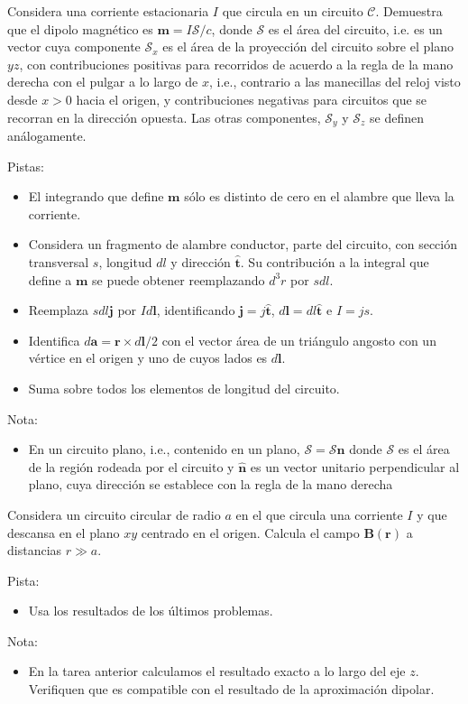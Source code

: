 \documentclass{exam}
\begin{document}
\begin{questions}
\question Considera una corriente estacionaria $I$ que circula en un circuito
  $\mathcal C$. Demuestra que el dipolo magnético es $\bm m=I\bm
  {\mathcal S}/c$, donde $\bm {\mathcal S}$ es el área del circuito,
  i.e. es un vector cuya componente $\mathcal S_x$ es el área de la
  proyección del circuito sobre el plano $yz$, con contribuciones
  positivas para recorridos de acuerdo a la regla de la mano derecha
  con el pulgar a lo largo de $x$, i.e., contrario a las manecillas
  del reloj visto desde $x>0$ hacia el origen, y contribuciones
  negativas para circuitos que se recorran en la dirección
  opuesta. Las otras componentes, $\mathcal S_y$ y $\mathcal S_z$ se
  definen análogamente.

  Pistas:
  \begin{itemize}
  \item El integrando que define $\bm m$ sólo es distinto de cero en
    el alambre que lleva la corriente.
  \item Considera un fragmento de alambre conductor, parte del
    circuito, con sección transversal $s$, longitud $dl$ y dirección
    $\hat{\bm t}$. Su contribución a la integral que define a $\bm m$
    se puede obtener reemplazando $d^3r$ por $sdl$.
  \item Reemplaza $sdl\bm j$ por $Id\bm l$, identificando $\bm
    j=j\hat{\bm t}$, $d\bm l=dl\hat{\bm t}$ e $I=js$.
  \item Identifica $d\bm a=\bm r\times d\bm l/2$ con el vector área de un triángulo
    angosto con un vértice en el origen y uno de cuyos lados es $d\bm
    l$.
  \item Suma sobre todos los elementos de longitud del circuito.
  \end{itemize}
  Nota:
  \begin{itemize}
  \item En un circuito plano, i.e., contenido en un plano,
    $\bm{\mathcal S}=\mathcal S\hat{\bm  n}$ donde $\mathcal S$ es el área
    de la región rodeada por el circuito y $\hat{\bm n}$ es un vector
    unitario perpendicular al plano, cuya dirección se establece con
    la regla de la mano derecha
  \end{itemize}


\question Considera un circuito circular de radio $a$ en el que
  circula una corriente $I$ y que descansa en el plano $xy$ centrado
  en el origen. Calcula el campo $\bm B(\bm r)$ a distancias $r\gg a$.

  Pista:
  \begin{itemize}
  \item Usa los resultados de los últimos problemas.
  \end{itemize}
  Nota:
  \begin{itemize}
  \item En la tarea anterior calculamos el resultado exacto a lo largo
    del eje $z$. Verifiquen que es compatible con el resultado de la
    aproximación dipolar.
  \end{itemize}


\end{questions}
\end{document}
